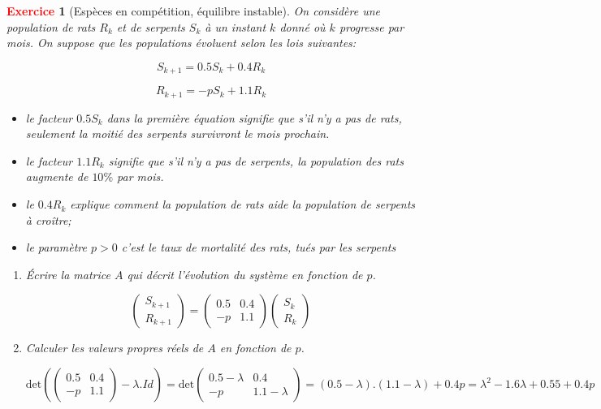 \documentclass[11pt]{article}
\theoremstyle{mythmstyle}
\newtheorem{exo}{\textcolor{red}{\textbf{Exercice}}}
\begin{document}
 \medskip
 
\begin{exo}[Espèces en compétition, équilibre instable]
On considère une population de rats $R_k$ et de serpents $S_k$ à un instant $k$ donné où $k$ progresse par mois. On suppose que les populations évoluent selon les lois suivantes:

$$
S_{k+1}= 0.5S_k + 0.4R_k
$$

$$
R_{k+1}= -p S_k+ 1.1R_k
$$

\begin{itemize}
\item le facteur $0.5 S_k$ dans la première équation signifie que s'il n'y a pas de rats, seulement la moitié des serpents survivront le mois prochain. 
\item le facteur $1.1R_k$ signifie que s'il n'y a pas de serpents, la population des rats augmente de $10\%$ par mois. 
\item le $0.4R_k$
explique comment la population de rats aide la population de serpents à croître;
\item le paramètre $p>0$ c'est le taux de mortalité des rats, tués par les serpents
\end{itemize}

\begin{enumerate}
    \item Écrire la matrice $A$ qui décrit l'évolution du système en fonction de $p$.
\begin{solution}
    $$
    \begin{pmatrix}S_{k+1}\\ R_{k+1}\end{pmatrix}=\begin{pmatrix}
    0.5& 0.4\\-p&1.1
    \end{pmatrix}\begin{pmatrix}
    S_k\\ R_k
    \end{pmatrix}
    $$
\end{solution}
    \item Calculer les valeurs propres réels de $A$ en fonction de $p$.
\begin{solution}
    $$\mathrm{det}(\begin{pmatrix}
    0.5& 0.4\\-p&1.1
    \end{pmatrix}-\lambda.Id)=\mathrm{det}\begin{pmatrix}
    0.5-\lambda& 0.4\\-p&1.1-\lambda
    \end{pmatrix}= (0.5-\lambda).(1.1-\lambda)+0.4p= \lambda^2 - 1.6 \lambda + 0.55 + 0.4p$$
    

\end{solution}
\end{enumerate}
\end{exo}
\end{document}
